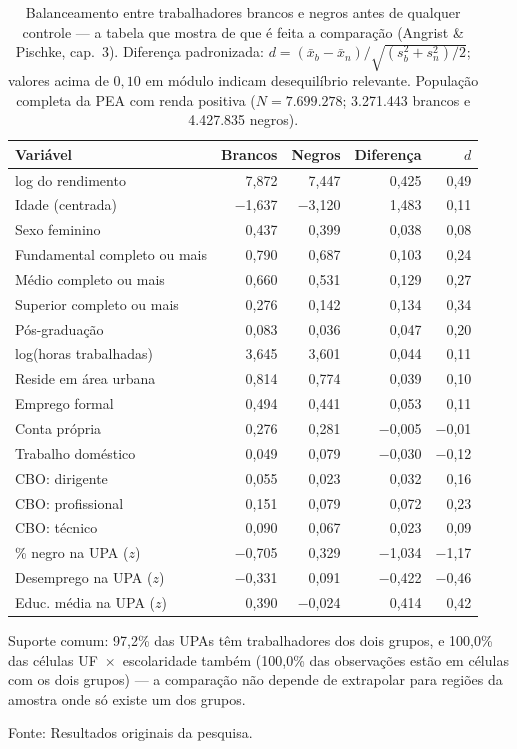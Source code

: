 \documentclass[11pt, a4paper, oneside]{article}
\begin{document}
\begin{table}[!ht]
\centering
\caption{Balanceamento entre trabalhadores brancos e negros {antes} de qualquer
controle --- a tabela que mostra de que é feita a comparação (Angrist \& Pischke, cap.~3).
Diferença padronizada: $d = (\bar x_b - \bar x_n)/\sqrt{(s_b^2+s_n^2)/2}$; valores acima de
$0{,}10$ em módulo indicam desequilíbrio relevante. População completa da PEA com renda
positiva ($N = 7.699.278$; 3.271.443 brancos e 4.427.835 negros).}
\label{tab:balanceamento}
\small
\begin{tabular}{lrrrr}
\toprule
Variável & Brancos & Negros & Diferença & $d$ \\
\midrule
log do rendimento & 7,872 & 7,447 & 0,425 & 0,49 \\
Idade (centrada) & −1,637 & −3,120 & 1,483 & 0,11 \\
Sexo feminino & 0,437 & 0,399 & 0,038 & 0,08 \\
Fundamental completo ou mais & 0,790 & 0,687 & 0,103 & 0,24 \\
Médio completo ou mais & 0,660 & 0,531 & 0,129 & 0,27 \\
Superior completo ou mais & 0,276 & 0,142 & 0,134 & 0,34 \\
Pós-graduação & 0,083 & 0,036 & 0,047 & 0,20 \\
log(horas trabalhadas) & 3,645 & 3,601 & 0,044 & 0,11 \\
Reside em área urbana & 0,814 & 0,774 & 0,039 & 0,10 \\
Emprego formal & 0,494 & 0,441 & 0,053 & 0,11 \\
Conta própria & 0,276 & 0,281 & −0,005 & −0,01 \\
Trabalho doméstico & 0,049 & 0,079 & −0,030 & −0,12 \\
CBO: dirigente & 0,055 & 0,023 & 0,032 & 0,16 \\
CBO: profissional & 0,151 & 0,079 & 0,072 & 0,23 \\
CBO: técnico & 0,090 & 0,067 & 0,023 & 0,09 \\
\% negro na UPA ($z$) & −0,705 & 0,329 & −1,034 & −1,17 \\
Desemprego na UPA ($z$) & −0,331 & 0,091 & −0,422 & −0,46 \\
Educ. média na UPA ($z$) & 0,390 & −0,024 & 0,414 & 0,42 \\
\bottomrule
\end{tabular}
\normalsize
\par\smallskip
\footnotesize{Suporte comum:} 97,2\% das UPAs têm
trabalhadores dos dois grupos, e 100,0\% das células
UF~$\times$~escolaridade também (100,0\% das observações
estão em células com os dois grupos) --- a comparação não depende de extrapolar para
regiões da amostra onde só existe um dos grupos.
\par\smallskip\footnotesize Fonte: Resultados originais da pesquisa.
\end{table}
\end{document}
